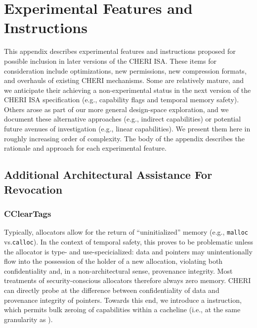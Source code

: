 \chapter{Experimental Features and Instructions}
\label{app:experimental}

This appendix describes experimental features and instructions proposed for
possible inclusion in later versions of the CHERI ISA.
These items for consideration include optimizations, new permissions, new
compression formats, and overhauls of existing CHERI mechanisms.
Some are relatively mature, and we anticipate their achieving a
non-experimental status in the next version of the CHERI ISA specification
(e.g., capability flags and temporal memory safety).
Others arose as part of our more general design-space exploration, and we
document these alternative approaches (e.g., indirect capabilities) or
potential future avenues of investigation (e.g., linear capabilities).
We present them here in roughly increasing order of complexity.
The body of the appendix describes the rationale and approach for each
experimental feature.

\section{Additional Architectural Assistance For Revocation} %

\subsection{CClearTags} %

Typically, allocators allow for the return of ``uninitialized'' memory
(e.g., \texttt{malloc} vs.\@ \texttt{calloc}).  In the context of temporal
safety, this proves to be problematic unless the allocator is type- and
use-specicialized: data and pointers may unintentionally flow into the
possession of the holder of a new allocation, violating both confidentiality
and, in a non-architectural sense, provenance integrity.  Most treatments of
security-conscious allocators therefore always zero memory.  CHERI can
directly probe at the difference between confidentiality of data and
provenance integrity of pointers.  Towards this end, we introduce a
 instruction, which permits bulk zeroing of
capabilities within a cacheline (i.e., at the same granularity as
).

